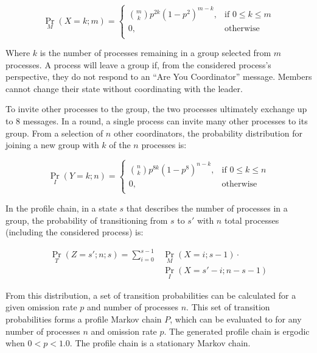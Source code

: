 \begin{equation}
 \Pr_{M}(X=k; m) =
   \begin{cases}
    \binom{m}{k} p^{2k}(1-p^2)^{m-k}, & \text{if } 0 \leq k \leq m \\
    0,                                & \text{otherwise} \\
  \end{cases}
\end{equation}

Where $k$ is the number of processes remaining in a group selected from $m$ processes.
A process will leave a group if, from the considered process's perspective, they do not respond to an ``Are You Coordinator'' message.
Members cannot change their state without coordinating with the leader.

To invite other processes to the group, the two processes ultimately exchange up to 8 messages.
In a round, a single process can invite many other processes to its group.
From a selection of $n$ other coordinators, the probability distribution for joining a new group with $k$ of the $n$ processes is:

\begin{equation}
	\Pr_{I}(Y=k; n) =
	\begin{cases}
		\binom{n}{k} p^{8k}(1-p^8)^{n-k}, & \text{if } 0 \leq k \leq n \\
		0,                                & \text{otherwise} \\
	\end{cases}
\end{equation}

In the profile chain, in a state $s$ that describes the number of processes in a group, the probability of transitioning from $s$ to $s'$ with $n$ total processes (including the considered process) is:

\begin{align} \Pr_{T}(Z=s'; n; s) = \sum_{i=0}^{s-1} &\Pr_{M}(X=i; s-1) \cdot
\nonumber \\ &\Pr_{I}(X=s'-i; n-s-1) \end{align}

From this distribution, a set of transition probabilities can be calculated for a given omission rate $p$ and number of processes $n$.
This set of transition probabilities forms a profile Markov chain $P$, which can be evaluated to for any number of processes $n$ and omission rate $p$.
The generated profile chain is ergodic when $0<p<1.0$. The profile chain is a stationary Markov chain.
